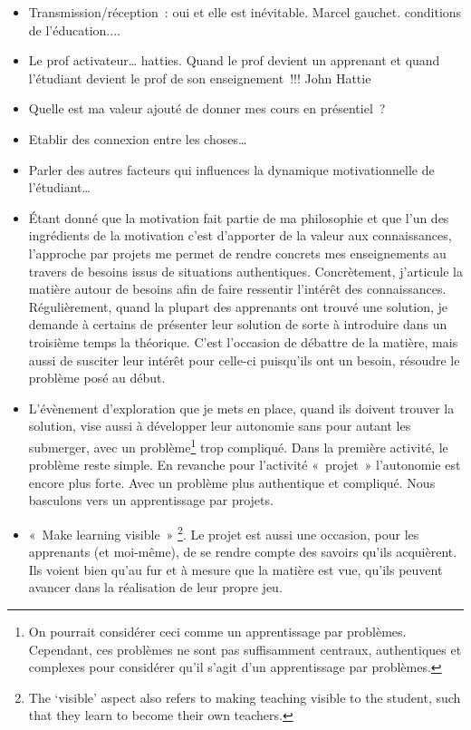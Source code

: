 \begin{itemize}
    \item Transmission/réception~: oui et elle est inévitable. Marcel gauchet. conditions de l'éducation....
    \item Le prof activateur… hatties. Quand le prof devient un apprenant et quand l'étudiant devient le prof de son enseignement~!!! John Hattie
    \item Quelle est ma valeur ajouté de donner mes cours en présentiel~?
    \item Etablir des connexion entre les choses…
    \item Parler des autres facteurs qui influences la dynamique motivationnelle de l'étudiant…
    \item Étant donné que la motivation fait partie de ma philosophie et que l’un des ingrédients de la motivation c’est d’apporter de la valeur aux connaissances\cite{viau1994motivation}, l’approche par projets me permet de rendre concrets mes enseignements au travers de besoins issus de situations authentiques. Concrètement, j'articule la matière autour de besoins afin de faire ressentir l'intérêt des connaissances. Régulièrement, quand la plupart des apprenants ont trouvé une solution, je demande à certains de présenter leur solution de sorte à introduire dans un troisième temps la théorique.  C’est l’occasion de débattre de la matière, mais aussi de susciter leur intérêt pour celle-ci puisqu’ils ont un besoin, résoudre le problème posé au début.
    \item L'évènement d'exploration que je mets en place, quand ils doivent trouver la solution, vise aussi à développer leur autonomie sans pour autant les submerger, avec un problème\footnote{On pourrait considérer ceci comme un apprentissage par problèmes. Cependant, ces problèmes ne sont pas suffisamment centraux, authentiques et complexes pour considérer qu’il s’agit d’un apprentissage par problèmes.} trop compliqué. Dans la première activité, le problème reste simple. En revanche pour l'activité «~projet~» l’autonomie est encore plus forte. Avec un problème plus authentique et compliqué. Nous basculons vers un apprentissage par projets.
    \item «~Make learning visible~» \footnote{The ‘visible’ aspect also refers to making teaching visible to the student, such that they learn to become their own teachers.}\cite{hattie2012visible}. Le projet est aussi une occasion, pour les apprenants (et moi-même), de se rendre compte des savoirs qu'ils acquièrent. Ils voient bien qu'au fur et à mesure que la matière est vue, qu’ils peuvent avancer dans la réalisation de leur propre jeu.

\end{itemize}
